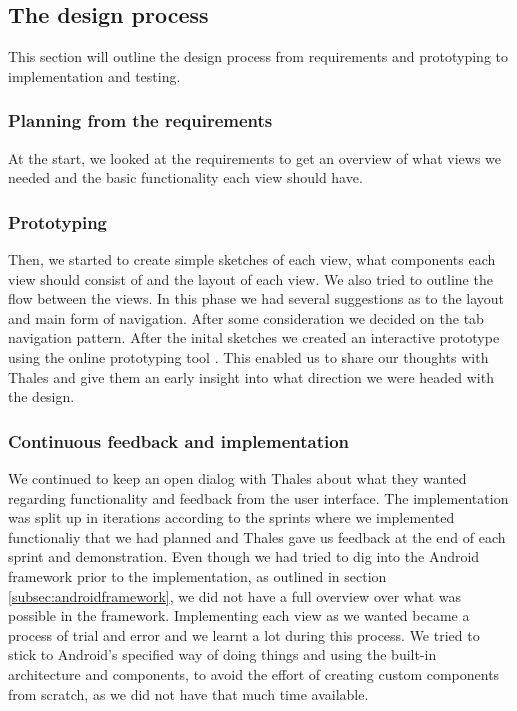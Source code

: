 \subsection{The design process}
This section will outline the design process from requirements and prototyping to implementation and testing.

\subsubsection{Planning from the requirements}
At the start, we looked at the requirements to get an overview of what views we needed and the basic functionality each view should have. 

\subsubsection{Prototyping}
Then, we started to create simple sketches of each view, what components each view should consist of and the layout of each view. We also tried to outline the flow between the views. In this phase we had several suggestions as to the layout and main form of navigation. After some consideration we decided on the tab navigation pattern.
\newline
\newline
After the inital sketches we created an interactive prototype using the online prototyping tool \cite{bib:fui}. This enabled us to share our thoughts with Thales and give them an early insight into what direction we were headed with the design.

\subsubsection{Continuous feedback and implementation}
We continued to keep an open dialog with Thales about what they wanted regarding functionality and feedback from the user interface. The implementation was split up in iterations according to the sprints where we implemented functionaliy that we had planned and Thales gave us feedback at the end of each sprint and demonstration. 
\newline
\newline
Even though we had tried to dig into the Android framework prior to the implementation, as outlined in section \ref{subsec:androidframework}, we did not have a full overview over what was possible in the framework. Implementing each view as we wanted became a process of trial and error and we learnt a lot during this process. We tried to stick to Android's specified way of doing things and using the built-in architecture and components, to avoid the effort of creating custom components from scratch, as we did not have that much time available. 

